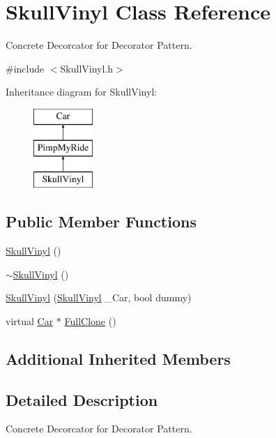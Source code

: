 \hypertarget{class_skull_vinyl}{}\section{Skull\+Vinyl Class Reference}
\label{class_skull_vinyl}


Concrete Decorcator for Decorator Pattern.  




{\ttfamily \#include $<$Skull\+Vinyl.\+h$>$}

Inheritance diagram for Skull\+Vinyl\+:\begin{figure}[H]
\begin{center}
\leavevmode
\includegraphics[height=3.000000cm]{class_skull_vinyl}
\end{center}
\end{figure}
\subsection*{Public Member Functions}
\begin{DoxyCompactItemize}
\item 
\mbox{\hyperlink{class_skull_vinyl_a360c56731f21884f2556e03217a83cbe}{Skull\+Vinyl}} ()
\item 
\mbox{\hyperlink{class_skull_vinyl_a214daefd097accf5e958ba6c9e445862}{$\sim$\+Skull\+Vinyl}} ()
\item 
\mbox{\hyperlink{class_skull_vinyl_aec437f032e0334c530dd940659a1d881}{Skull\+Vinyl}} (\mbox{\hyperlink{class_skull_vinyl}{Skull\+Vinyl}} \+\_\+\+Car, bool dummy)
\item 
virtual \mbox{\hyperlink{class_car}{Car}} $\ast$ \mbox{\hyperlink{class_skull_vinyl_a02a74e1366553be8263a5751239bb8bf}{Full\+Clone}} ()
\end{DoxyCompactItemize}
\subsection*{Additional Inherited Members}


\subsection{Detailed Description}
Concrete Decorcator for Decorator Pattern. 

